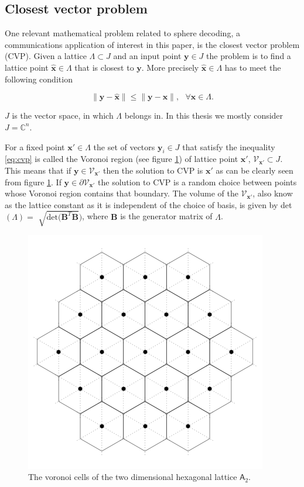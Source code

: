 \documentclass[english,12pt,a4paper,pdftex,sci,utf8]{aaltothesis}
\begin{document}
\subsection{Closest vector problem}

One relevant mathematical problem related to sphere decoding, a communications application of interest in this paper, is the closest vector problem (CVP). Given a lattice $\Lambda \subset J$ and an input point $\mathbf{y} \in J$ the problem is to find a lattice point $\hat{\mathbf{x}} \in \Lambda$ that is closest to $\mathbf{y}$. More precisely $\hat{\mathbf{x}} \in \Lambda$ has to meet the following condition

\begin{equation}
\|\mathbf{y}-\hat{\mathbf{x}}\| \leq \|\mathbf{y}-\mathbf{x}\|, \ \ \ \forall \mathbf{x} \in \Lambda.
\label{eq:cvp}
\end{equation}

\noindent$J$ is the vector space, in which $\Lambda$ belongs in. In this thesis we mostly consider $J=\mathbb{C}^n$. 
\par For a fixed point $\mathbf{x}' \in \Lambda$ the set of vectors $\mathbf{y}_i \in J$ that satisfy the inequality \eqref{eq:cvp} is called the Voronoi region (see figure \ref{fig:voronoi}) of lattice point $\mathbf{x}'$, $\mathcal{V}_{\mathbf{x}'} \subset J$. This means that if $\mathbf{y} \in \mathcal{V}_{\mathbf{x}'}$ then the solution to CVP is $\mathbf{x}'$ as can be clearly seen from figure \ref{fig:voronoi}. If $\mathbf{y} \in \partial\mathcal{V}_{\mathbf{x}'}$ the solution to CVP is a random choice between points whose Voronoi region contains that boundary. The volume of the $\mathcal{V}_{\mathbf{x}'}$, also know as the lattice constant as it is independent of the choice of basis, is given by det$(\Lambda) = $ $\sqrt{\text{det}(\mathbf{B}^T\mathbf{B}})$, where $\mathbf{B}$ is the generator matrix of $\Lambda$. 

\begin{figure}[ht]
  \centering
  \includegraphics[width=0.5\linewidth]{voronoi_cells}
  \caption{The voronoi cells of the two dimensional hexagonal lattice $\mathsf{A}_2$.}
  \label{fig:voronoi}
\end{figure}
\end{document}
